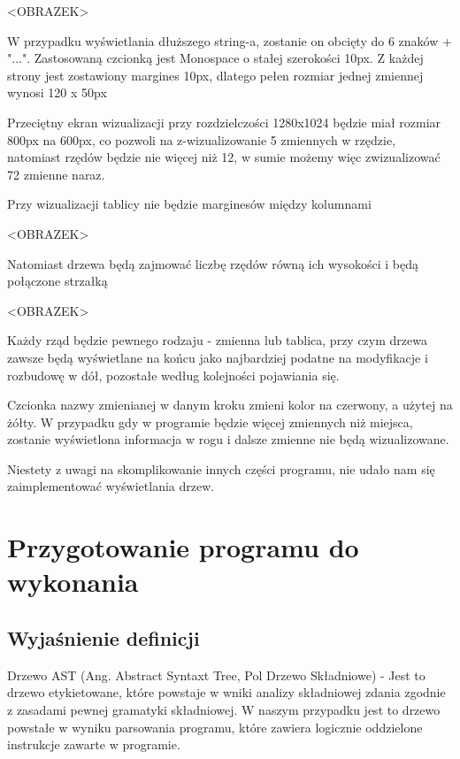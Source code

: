 \documentclass[a4paper,twoside,openright,11pt]{report}
\begin{document}
\par <OBRAZEK>

\par W przypadku wyświetlania dłuższego string-a, zostanie on obcięty do 6 znaków + "...".
Zastosowaną czcionką jest Monospace o stałej szerokości 10px. Z każdej strony jest zostawiony margines 10px, dlatego pełen rozmiar jednej zmiennej wynosi 120 x 50px 
\par Przeciętny ekran wizualizacji przy rozdzielczości 1280x1024 będzie miał rozmiar 800px na 600px, co pozwoli na z-wizualizowanie 5 zmiennych w rzędzie, natomiast rzędów będzie nie więcej niż 12, w sumie możemy więc zwizualizować 72 zmienne naraz. 
\par Przy wizualizacji tablicy nie będzie marginesów między kolumnami 

\par <OBRAZEK>
	
\par Natomiast drzewa będą zajmować liczbę rzędów równą ich wysokości i będą połączone strzałką

\par <OBRAZEK>

\par Każdy rząd będzie pewnego rodzaju - zmienna lub tablica, przy czym drzewa zawsze będą wyświetlane na końcu jako najbardziej podatne na modyfikacje i rozbudowę w dół, pozostałe według kolejności pojawiania się. 
\par Czcionka nazwy zmienianej w danym kroku zmieni kolor na czerwony, a użytej na żółty. W przypadku gdy w programie będzie więcej zmiennych niż miejsca, zostanie wyświetlona informacja w rogu i dalsze zmienne nie będą wizualizowane. 
\par Niestety z uwagi na skomplikowanie innych części programu, nie udało nam się zaimplementować wyświetlania drzew.

  \chapter {Przygotowanie programu do wykonania}
  
  \section {Wyjaśnienie definicji}

\par Drzewo AST (Ang. Abstract Syntaxt Tree, Pol Drzewo Składniowe) - Jest to drzewo etykietowane, które powstaje w wniki analizy składniowej zdania zgodnie z zasadami pewnej gramatyki składniowej. W naszym przypadku jest to drzewo powstałe w wyniku parsowania programu, które zawiera logicznie oddzielone instrukcje zawarte w programie.
\end{document}
